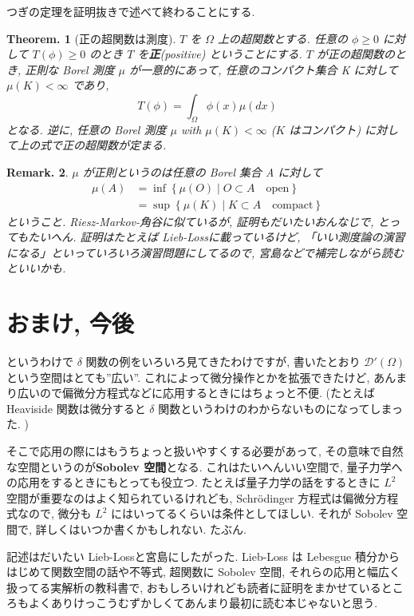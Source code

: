 \documentclass[openany, a4paper, oneside]{jsbook}
\theoremstyle{break}
\theoremstyle{breakdefn}
\newtheorem{thm}{Theorem.}[section]
\newtheorem{rem}[thm]{Remark.}
\newcommand{\relmiddle}[1]{\mathrel{}\middle#1\mathrel{}}
\newcommand{\set}[2]{\left\{#1 \relmiddle| #2\right\}}
\begin{document}
つぎの定理を証明抜きで述べて終わることにする.
\begin{thm}[正の超関数は測度]
 $T$ を $\Omega$ 上の超関数とする.
 任意の $\phi \ge 0$ に対して $T (\phi) \ge 0$ のとき $T$ を\textbf{正}(positive) ということにする.
 $T$ が正の超関数のとき, 正則な Borel 測度 $\mu$ が一意的にあって,
 任意のコンパクト集合 K に対して $\mu (K) < \infty$ であり,
 \begin{equation}
  T (\phi) = \int_{\Omega}\phi (x)\mu (dx)
 \end{equation}
 となる.
 逆に, 任意の Borel 測度 $\mu$  with  $\mu (K) < \infty$ ($K$ はコンパクト) に対して上の式で正の超関数が定まる.
\end{thm}
\begin{rem}
 $\mu$ が正則というのは任意の Borel 集合 A に対して
 \begin{align}
  \mu (A)
  &=
  \inf \set{\mu (O)}{O \subset A \quad \text{open}} \\
  &=
  \sup \set{\mu (K)}{K \subset A \quad \text{compact}}
 \end{align}
 ということ.
 Riesz-Markov-角谷に似ているが, 証明もだいたいおんなじで, とってもたいへん.
 証明はたとえば Lieb-Loss\cite{LiebLoss1}に載っているけど,
 「いい測度論の演習になる」といっていろいろ演習問題にしてるので,
 宮島\cite{ShizuoMiyajima2}などで補完しながら読むといいかも.
\end{rem}
\section{おまけ, 今後}


というわけで $\delta$ 関数の例をいろいろ見てきたわけですが,
書いたとおり $\mathcal{D}'(\Omega)$ という空間はとても''広い''.
これによって微分操作とかを拡張できたけど, あんまり広いので偏微分方程式などに応用するときにはちょっと不便.
(たとえば Heaviside 関数は微分すると $\delta$ 関数というわけのわからないものになってしまった. )

そこで応用の際にはもうちょっと扱いやすくする必要があって,
その意味で自然な空間というのが\textbf{Sobolev 空間}となる.
これはたいへんいい空間で, 量子力学への応用をするときにもとっても役立つ.
たとえば量子力学の話をするときに $L^2$ 空間が重要なのはよく知られているけれども,
Schr\"odinger 方程式は偏微分方程式なので,
微分も $L^2$ にはいってるくらいは条件としてほしい.
それが Sobolev 空間で, 詳しくはいつか書くかもしれない.
たぶん.

記述はだいたい Lieb-Loss\cite{LiebLoss1}と宮島\cite{ShizuoMiyajima1}にしたがった.
Lieb-Loss は Lebesgue 積分からはじめて関数空間の話や不等式,
超関数に Sobolev 空間, それらの応用と幅広く扱ってる実解析の教科書で,
おもしろいけれども読者に証明をまかせているところもよくありけっこうむずかしくてあんまり最初に読む本じゃないと思う.
\end{document}
